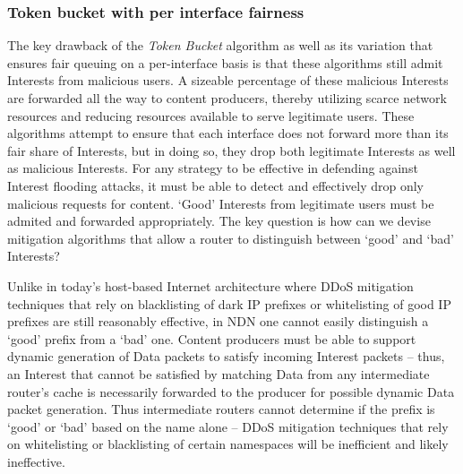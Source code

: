 


\subsubsection{\textbf{Token bucket with per interface fairness}}
\label{sec:queuing}





The key drawback of the {\it Token Bucket} algorithm as well as its variation that ensures fair queuing on a per-interface basis is that these algorithms still admit Interests from malicious users. A sizeable percentage of these malicious Interests are forwarded all the way to content producers, thereby utilizing scarce network resources and reducing resources available to serve legitimate users.  These algorithms attempt to ensure that each interface does not forward more than its fair share of Interests, but in doing so, they drop both legitimate Interests as well as malicious Interests. For any strategy to be effective in defending against Interest flooding attacks, it must be able to detect and effectively drop only malicious requests for content. `Good' Interests from legitimate users must be admited and forwarded appropriately. The key question is how can we devise mitigation algorithms that allow a router to distinguish between `good' and `bad' Interests? 

Unlike in today's host-based Internet architecture where DDoS mitigation techniques that rely on blacklisting of dark IP prefixes or whitelisting of good IP prefixes are still reasonably effective, in NDN one cannot easily distinguish a `good' prefix from a `bad' one. Content producers must be able to support dynamic generation of Data packets to satisfy incoming Interest packets -- thus, an Interest that cannot be satisfied by matching Data from any intermediate router's cache is necessarily forwarded to the producer for possible dynamic Data packet generation. Thus intermediate routers cannot determine if the prefix is `good' or `bad' based on the name alone -- DDoS mitigation techniques that rely on whitelisting or blacklisting of certain namespaces  will be inefficient and likely ineffective. 

